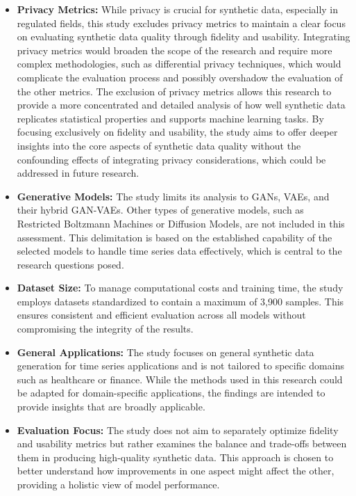 \documentclass{article}
\begin{document}
\begin{itemize}
    \item \textbf{Privacy Metrics:} While privacy is crucial for synthetic data, especially in regulated fields, this study excludes privacy metrics to maintain a clear focus on evaluating synthetic data quality through fidelity and usability. Integrating privacy metrics would broaden the scope of the research and require more complex methodologies, such as differential privacy techniques, which would complicate the evaluation process and possibly overshadow the evaluation of the other metrics. The exclusion of privacy metrics allows this research to provide a more concentrated and detailed analysis of how well synthetic data replicates statistical properties and supports machine learning tasks. By focusing exclusively on fidelity and usability, the study aims to offer deeper insights into the core aspects of synthetic data quality without the confounding effects of integrating privacy considerations, which could be addressed in future research.

    \item \textbf{Generative Models:} The study limits its analysis to GANs, VAEs, and their hybrid GAN-VAEs. Other types of generative models, such as Restricted Boltzmann Machines or Diffusion Models, are not included in this assessment. This delimitation is based on the established capability of the selected models to handle time series data effectively, which is central to the research questions posed.

    \item \textbf{Dataset Size:} To manage computational costs and training time, the study employs datasets standardized to contain a maximum of 3,900 samples. This ensures consistent and efficient evaluation across all models without compromising the integrity of the results.
    
    \item \textbf{General Applications:} The study focuses on general synthetic data generation for time series applications and is not tailored to specific domains such as healthcare or finance. While the methods used in this research could be adapted for domain-specific applications, the findings are intended to provide insights that are broadly applicable.

    \item \textbf{Evaluation Focus:} The study does not aim to separately optimize fidelity and usability metrics but rather examines the balance and trade-offs between them in producing high-quality synthetic data. This approach is chosen to better understand how improvements in one aspect might affect the other, providing a holistic view of model performance. 

\end{itemize}
\end{document}
